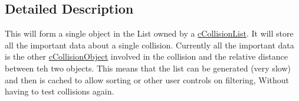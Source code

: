 \subsection{Detailed Description}
This will form a single object in the List owned by a \hyperlink{classc_collision_list}{cCollisionList}. It will store all the important data about a single collision. Currently all the important data is the other \hyperlink{classc_collision_object}{cCollisionObject} involved in the collision and the relative distance between teh two objects. This means that the list can be generated (very slow) and then is cached to allow sorting or other user controls on filtering, Without having to test collisions again. 